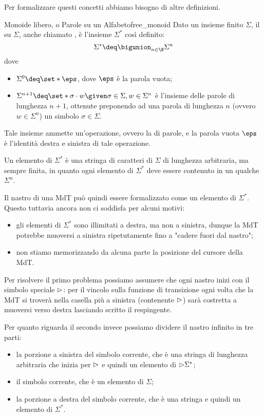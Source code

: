 Per formalizzare questi concetti abbiamo bisogno di altre definizioni.

\begin{definition}
    {Monoide libero, o Parole su un Alfabeto}{free_monoid}
    Dato un insieme finito $\Sigma$, il  su $\Sigma$, anche chiamato , è l'insieme $\Sigma^\ast$ così definito: \[
        \Sigma^\ast \deq \bigunion_{n \in \N} \Sigma^n
    \] dove \begin{itemize}
        \item $\Sigma^0 \deq \set*{\eps}$, dove $\eps$ è la parola vuota;
        \item $\Sigma^{n+1} \deq \set*{\sigma \cdot w \given \sigma \in \Sigma, w \in \Sigma^n}$ è l'insieme delle parole di lunghezza $n+1$, ottenute preponendo ad una parola di lunghezza $n$ (ovvero $w \in \Sigma^n$) un simbolo $\sigma \in \Sigma$. 
    \end{itemize}
    Tale insieme ammette un'operazione, ovvero la  di parole, e la parola vuota $\eps$ è l'identità destra e sinistra di tale operazione. 
\end{definition}

\begin{remark}
    Un elemento di $\Sigma^\ast$ è una stringa di caratteri di $\Sigma$ di lunghezza arbitraria, ma sempre finita, in quanto ogni elemento di $\Sigma^\ast$ deve essere contenuto in un qualche $\Sigma^n$.
\end{remark}

Il nastro di una MdT può quindi essere formalizzato come un elemento di $\Sigma^\ast$. Questo tuttavia ancora non ci soddisfa per alcuni motivi:
\begin{itemize}
    \item gli elementi di $\Sigma^\ast$ sono illimitati a destra, ma non a sinistra, dunque la MdT potrebbe muoversi a sinistra ripetutamente fino a "cadere fuori dal nastro";
    \item non stiamo memorizzando da alcuna parte la posizione del cursore della MdT.
\end{itemize}

Per risolvere il primo problema possiamo assumere che ogni nastro inizi con il simbolo speciale ${\vartriangleright}$:
per il vincolo sulla funzione di transizione ogni volta che la MdT si troverà nella casella più a sinistra (contenente ${\vartriangleright}$) sarà costretta a muoversi verso destra lasciando scritto il respingente.

Per quanto riguarda il secondo invece possiamo dividere il nastro infinito in tre parti: \begin{itemize}
    \item la porzione a sinistra del simbolo corrente, che è una stringa di lunghezza arbitraria che inizia per ${\vartriangleright}$ e quindi un elemento di ${\vartriangleright}\Sigma^\ast$;
    \item il simbolo corrente, che è un elemento di $\Sigma$;
    \item la porzione a destra del simbolo corrente, che è una stringa e quindi un elemento di $\Sigma^\ast$.   
\end{itemize}

